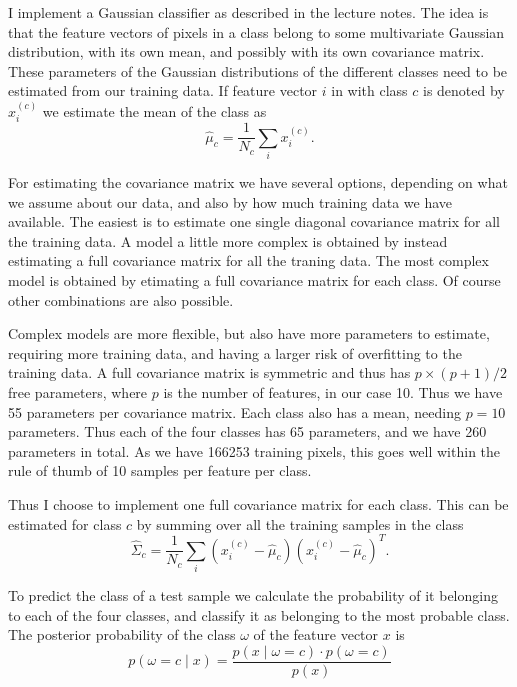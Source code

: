 \documentclass[a4paper]{article}
\begin{document}
I implement a Gaussian classifier as described in the lecture notes. The
idea is that the feature vectors of pixels in a class belong to some
multivariate Gaussian distribution, with its own mean, and possibly with
its own covariance matrix. These parameters of the Gaussian
distributions of the different classes need to be estimated from our
training data. If feature vector $i$ in with class $c$ is denoted by
$x^{(c)}_i$ we estimate the mean of the class as
\begin{equation}
    \hat{\mu}_c = \frac{1}{N_c} \sum_i x^{(c)}_i.
\end{equation}

For estimating the covariance matrix we have several options, depending
on what we assume about our data, and also by how much training data we
have available. The easiest is to estimate one single diagonal
covariance matrix for all the training data. A model a little more
complex is obtained by instead estimating a full covariance matrix for
all the traning data. The most complex model is obtained by etimating a
full covariance matrix for each class. Of course other combinations are
also possible.

Complex models are more flexible, but also have more parameters to
estimate, requiring more training data, and having a larger risk of
overfitting to the training data. A full covariance matrix is symmetric
and thus has $p \times (p+1) / 2$ free parameters, where $p$ is the
number of features, in our case 10. Thus we have 55 parameters per
covariance matrix. Each class also has a mean, needing $p = 10$
parameters. Thus each of the four classes has 65 parameters, and we have
260 parameters in total. As we have 166253 training pixels, this goes
well within the rule of thumb of 10 samples per feature per class.

Thus I choose to implement one full covariance matrix for each class.
This can be estimated for class $c$ by summing over all the training
samples in the class
\begin{equation}
    \hat{\Sigma}_c = \frac{1}{N_c} \sum_i (x^{(c)}_i -
    \hat{\mu}_c)(x^{(c)}_i - \hat{\mu}_c)^T.
\end{equation}

To predict the class of a test sample we calculate the probability of it
belonging to each of the four classes, and classify it as belonging to
the most probable class. The posterior probability of the class $\omega$
of the feature vector $x$ is
\begin{equation}
    p(\omega = c \mid x) = \frac{p(x \mid \omega = c) \cdot p(\omega =
    c)}{p(x)}
\end{equation}
\end{document}
